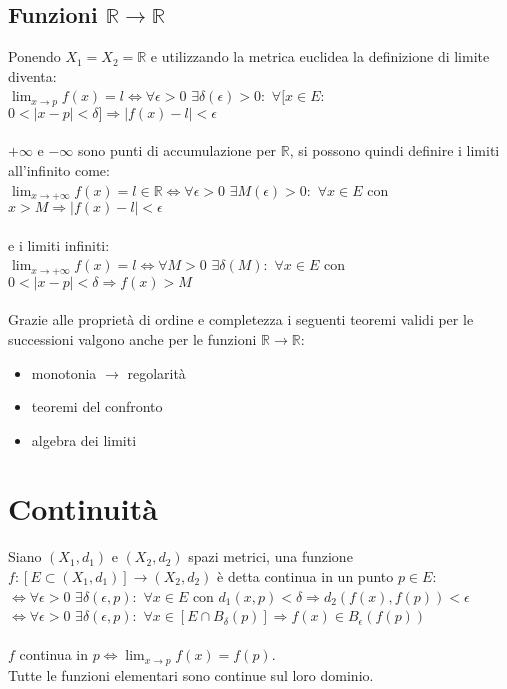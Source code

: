 \documentclass{article}
\begin{document}
\subsection{Funzioni $\mathds{R}\rightarrow\mathds{R}$}
Ponendo $X_1=X_2=\mathds{R}$ e utilizzando la metrica euclidea la definizione di limite diventa:\\
$\lim_{x\rightarrow p}f(x)=l\Leftrightarrow\forall\epsilon>0$ $\exists\delta(\epsilon)>0:$ $\forall[x\in E:$ $0<|x-p|<\delta]\Rightarrow|f(x)-l|<\epsilon$\\\\
$+\infty$ e $-\infty$ sono punti di accumulazione per $\mathds{R}$, si possono quindi definire i limiti all'infinito come:\\
$\lim_{x\rightarrow+\infty}f(x)=l\in\mathds{R}\Leftrightarrow\forall \epsilon>0$ $\exists M(\epsilon)>0:$ $\forall x\in E$ con $x>M\Rightarrow|f(x)-l|<\epsilon$\\\\
e i limiti infiniti:\\
$\lim_{x\rightarrow+\infty}f(x)=l\Leftrightarrow\forall M>0$ $\exists\delta(M):$ $\forall x\in E$ con $0<|x-p|<\delta\Rightarrow f(x)>M$\\\\
Grazie alle proprietà di ordine e completezza i seguenti teoremi validi per le successioni valgono anche per le funzioni $\mathds{R}\rightarrow\mathds{R}$:
\begin{itemize}
    \item monotonia $\rightarrow$ regolarità
    \item teoremi del confronto
    \item algebra dei limiti
\end{itemize}

\section{Continuità}
Siano $(X_1,d_1)$ e $(X_2,d_2)$ spazi metrici, una funzione $f:[E\subset(X_1,d_1)]\rightarrow(X_2,d_2)$ è detta continua in un punto $p\in E$:\\
$\Leftrightarrow\forall\epsilon>0$ $\exists\delta(\epsilon,p):$ $\forall x\in E$ con $d_1(x,p)<\delta\Rightarrow d_2(f(x),f(p))<\epsilon$\\
$\Leftrightarrow\forall\epsilon>0$ $\exists\delta(\epsilon,p):$ $\forall x\in[E\cap B_\delta(p)]\Rightarrow f(x)\in B_\epsilon(f(p))$\\\\
$f$ continua in $p\Leftrightarrow\lim_{x\rightarrow p}f(x)=f(p)$.\\
Tutte le funzioni elementari sono continue sul loro dominio.
\end{document}
